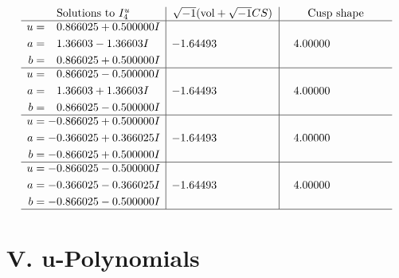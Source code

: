 \documentclass[1p]{elsarticle_modified}
\theoremstyle{definition}
\newcommand{\I}{\sqrt{-1}}
\begin{document}
$$\begin{array}{c|c|c}  
\text{Solutions to }I^u_{4}& \I (\text{vol} + \sqrt{-1}CS) & \text{Cusp shape}\\
 \hline 
\begin{aligned}
u &= \phantom{-}0.866025 + 0.500000 I \\
a &= \phantom{-}1.36603 - 1.36603 I \\
b &= \phantom{-}0.866025 + 0.500000 I\end{aligned}
 & -1.64493\phantom{ +0.000000I} & \phantom{-}4.00000\phantom{ +0.000000I} \\ \hline\begin{aligned}
u &= \phantom{-}0.866025 - 0.500000 I \\
a &= \phantom{-}1.36603 + 1.36603 I \\
b &= \phantom{-}0.866025 - 0.500000 I\end{aligned}
 & -1.64493\phantom{ +0.000000I} & \phantom{-}4.00000\phantom{ +0.000000I} \\ \hline\begin{aligned}
u &= -0.866025 + 0.500000 I \\
a &= -0.366025 + 0.366025 I \\
b &= -0.866025 + 0.500000 I\end{aligned}
 & -1.64493\phantom{ +0.000000I} & \phantom{-}4.00000\phantom{ +0.000000I} \\ \hline\begin{aligned}
u &= -0.866025 - 0.500000 I \\
a &= -0.366025 - 0.366025 I \\
b &= -0.866025 - 0.500000 I\end{aligned}
 & -1.64493\phantom{ +0.000000I} & \phantom{-}4.00000\phantom{ +0.000000I}\\
 \hline 
 \end{array}$$\newpage
\newpage\renewcommand{\arraystretch}{1}
\centering \section*{ V. u-Polynomials}
\end{document}
